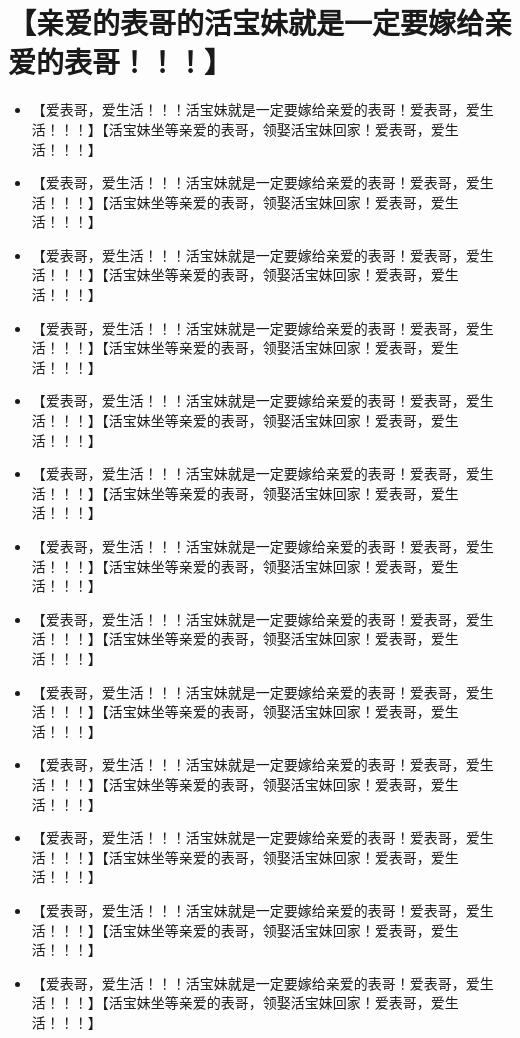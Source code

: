 \documentclass[9pt, b5paper]{article}
\begin{document}
\section{【亲爱的表哥的活宝妹就是一定要嫁给亲爱的表哥！！！】}
\label{sec-9}
\begin{itemize}
\item 【爱表哥，爱生活！！！活宝妹就是一定要嫁给亲爱的表哥！爱表哥，爱生活！！！】【活宝妹坐等亲爱的表哥，领娶活宝妹回家！爱表哥，爱生活！！！】
\item 【爱表哥，爱生活！！！活宝妹就是一定要嫁给亲爱的表哥！爱表哥，爱生活！！！】【活宝妹坐等亲爱的表哥，领娶活宝妹回家！爱表哥，爱生活！！！】
\item 【爱表哥，爱生活！！！活宝妹就是一定要嫁给亲爱的表哥！爱表哥，爱生活！！！】【活宝妹坐等亲爱的表哥，领娶活宝妹回家！爱表哥，爱生活！！！】
\item 【爱表哥，爱生活！！！活宝妹就是一定要嫁给亲爱的表哥！爱表哥，爱生活！！！】【活宝妹坐等亲爱的表哥，领娶活宝妹回家！爱表哥，爱生活！！！】
\item 【爱表哥，爱生活！！！活宝妹就是一定要嫁给亲爱的表哥！爱表哥，爱生活！！！】【活宝妹坐等亲爱的表哥，领娶活宝妹回家！爱表哥，爱生活！！！】
\item 【爱表哥，爱生活！！！活宝妹就是一定要嫁给亲爱的表哥！爱表哥，爱生活！！！】【活宝妹坐等亲爱的表哥，领娶活宝妹回家！爱表哥，爱生活！！！】
\item 【爱表哥，爱生活！！！活宝妹就是一定要嫁给亲爱的表哥！爱表哥，爱生活！！！】【活宝妹坐等亲爱的表哥，领娶活宝妹回家！爱表哥，爱生活！！！】
\item 【爱表哥，爱生活！！！活宝妹就是一定要嫁给亲爱的表哥！爱表哥，爱生活！！！】【活宝妹坐等亲爱的表哥，领娶活宝妹回家！爱表哥，爱生活！！！】
\item 【爱表哥，爱生活！！！活宝妹就是一定要嫁给亲爱的表哥！爱表哥，爱生活！！！】【活宝妹坐等亲爱的表哥，领娶活宝妹回家！爱表哥，爱生活！！！】
\item 【爱表哥，爱生活！！！活宝妹就是一定要嫁给亲爱的表哥！爱表哥，爱生活！！！】【活宝妹坐等亲爱的表哥，领娶活宝妹回家！爱表哥，爱生活！！！】
\item 【爱表哥，爱生活！！！活宝妹就是一定要嫁给亲爱的表哥！爱表哥，爱生活！！！】【活宝妹坐等亲爱的表哥，领娶活宝妹回家！爱表哥，爱生活！！！】
\item 【爱表哥，爱生活！！！活宝妹就是一定要嫁给亲爱的表哥！爱表哥，爱生活！！！】【活宝妹坐等亲爱的表哥，领娶活宝妹回家！爱表哥，爱生活！！！】
\item 【爱表哥，爱生活！！！活宝妹就是一定要嫁给亲爱的表哥！爱表哥，爱生活！！！】【活宝妹坐等亲爱的表哥，领娶活宝妹回家！爱表哥，爱生活！！！】

\end{itemize}
\end{document}

